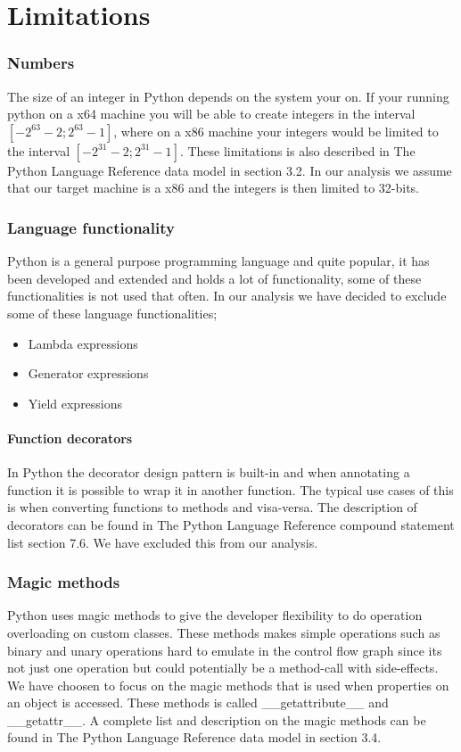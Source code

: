 \chapter{Limitations}

\subsection{Numbers}
The size of an integer in Python depends on the system your on. If your running python on a x64 machine you will be able to create integers in the interval $[-2^{63}-2;2^{63}-1]$, where on a x86 machine your integers would be limited to the interval $[-2^{31}-2;2^{31}-1]$. These limitations is also described in The Python Language Reference data model\cite{pyref.datamodel} in section 3.2. In our analysis we assume that our target machine is a x86 and the integers is then limited to 32-bits.

\subsection{Language functionality}
Python is a general purpose programming language and quite popular, it has been developed and extended and holds a lot of functionality, some of these functionalities is not used that often. In our analysis we have decided to exclude some of these language functionalities;

\begin{itemize}
	\item Lambda expressions
	\item Generator expressions
	\item Yield expressions
\end{itemize}

\subsubsection{Function decorators}
In Python the decorator design pattern is built-in and when annotating a function it is possible to wrap it in another function. The typical use cases of this is when converting functions to methods and visa-versa. The description of decorators can be found in The Python Language Reference compound statement list\cite{pyref.compound} section 7.6. We have excluded this from our analysis.

\subsection{Magic methods}
Python uses magic methods to give the developer flexibility to do operation overloading on custom classes. These methods makes simple operations such as binary and unary operations hard to emulate in the control flow graph since its not just one operation but could potentially be a method-call with side-effects. \\
We have choosen to focus on the magic methods that is used when properties on an object is accessed. These methods is called \_\_getattribute\_\_ and \_\_getattr\_\_. A complete list and description on the magic methods can be found in The Python Language Reference data model\cite{pyref.datamodel} in section 3.4.
